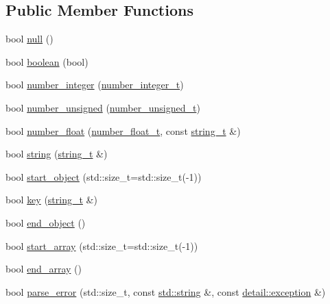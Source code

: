 \subsection*{Public Member Functions}
\begin{DoxyCompactItemize}
\item 
bool \hyperlink{classnlohmann_1_1detail_1_1json__sax__acceptor_ad7ad55168af6e03ed8b844c94a17b9ce}{null} ()
\item 
bool \hyperlink{classnlohmann_1_1detail_1_1json__sax__acceptor_a3f5fe42a9b195de8d251d6d98d5ee92c}{boolean} (bool)
\item 
bool \hyperlink{classnlohmann_1_1detail_1_1json__sax__acceptor_a976bf4ce6e9a2ffe48f683ddff80af00}{number\+\_\+integer} (\hyperlink{classnlohmann_1_1detail_1_1json__sax__acceptor_a41876b17c0e8bdb55580eaf5e4e2ded8}{number\+\_\+integer\+\_\+t})
\item 
bool \hyperlink{classnlohmann_1_1detail_1_1json__sax__acceptor_ad15b288f3351287edbe289502f595491}{number\+\_\+unsigned} (\hyperlink{classnlohmann_1_1detail_1_1json__sax__acceptor_ae07454608ea6f3cfb765f95e3c850043}{number\+\_\+unsigned\+\_\+t})
\item 
bool \hyperlink{classnlohmann_1_1detail_1_1json__sax__acceptor_aebf8800023eb20d472f111f86b189e60}{number\+\_\+float} (\hyperlink{classnlohmann_1_1detail_1_1json__sax__acceptor_a5502f483fc60a1bcd73e0e46b6ab36e4}{number\+\_\+float\+\_\+t}, const \hyperlink{classnlohmann_1_1detail_1_1json__sax__acceptor_a3a8078bbf865ec355106f6048241609a}{string\+\_\+t} \&)
\item 
bool \hyperlink{classnlohmann_1_1detail_1_1json__sax__acceptor_aaa69255e757a6ecc4403a2aa4931fc60}{string} (\hyperlink{classnlohmann_1_1detail_1_1json__sax__acceptor_a3a8078bbf865ec355106f6048241609a}{string\+\_\+t} \&)
\item 
bool \hyperlink{classnlohmann_1_1detail_1_1json__sax__acceptor_a822bbca11a9fea0aa337018e351755f5}{start\+\_\+object} (std\+::size\+\_\+t=std\+::size\+\_\+t(-\/1))
\item 
bool \hyperlink{classnlohmann_1_1detail_1_1json__sax__acceptor_a59e1ea5e9c8d25346a564bf9287a5c2a}{key} (\hyperlink{classnlohmann_1_1detail_1_1json__sax__acceptor_a3a8078bbf865ec355106f6048241609a}{string\+\_\+t} \&)
\item 
bool \hyperlink{classnlohmann_1_1detail_1_1json__sax__acceptor_a919645fd1827a561a994d70a435e3f19}{end\+\_\+object} ()
\item 
bool \hyperlink{classnlohmann_1_1detail_1_1json__sax__acceptor_a8238e8090cbb4ed8a22cbc97bfb833a5}{start\+\_\+array} (std\+::size\+\_\+t=std\+::size\+\_\+t(-\/1))
\item 
bool \hyperlink{classnlohmann_1_1detail_1_1json__sax__acceptor_a22ef94ca5476a9563dcaca15b7d6e654}{end\+\_\+array} ()
\item 
bool \hyperlink{classnlohmann_1_1detail_1_1json__sax__acceptor_a95bb3e8b6feaa523ecda8106fb5e38e3}{parse\+\_\+error} (std\+::size\+\_\+t, const \hyperlink{namespacenlohmann_1_1detail_a1ed8fc6239da25abcaf681d30ace4985ab45cffe084dd3d20d928bee85e7b0f21}{std\+::string} \&, const \hyperlink{classnlohmann_1_1detail_1_1exception}{detail\+::exception} \&)
\end{DoxyCompactItemize}


